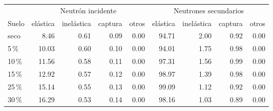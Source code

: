 \begin{tabular}{lrrrrrrrr}
\toprule
 & \multicolumn{4}{c}{Neutrón incidente} & \multicolumn{4}{c}{Neutrones secundarios} \\
\cmidrule(lr){2-5}\cmidrule(lr){6-9}
Suelo & elástica & inelástica & captura & otros & elástica & inelástica & captura & otros \\
\midrule
seco & 8.46 & 0.61 & 0.09 & 0.00 & 94.71 & 2.00 & 0.92 & 0.00 \\
5\,\% & 10.03 & 0.60 & 0.10 & 0.00 & 94.01 & 1.75 & 0.98 & 0.00 \\
10\,\% & 11.56 & 0.58 & 0.11 & 0.00 & 97.31 & 1.56 & 0.99 & 0.00 \\
15\,\% & 12.92 & 0.57 & 0.12 & 0.00 & 98.97 & 1.39 & 0.98 & 0.00 \\
25\,\% & 15.14 & 0.55 & 0.13 & 0.00 & 99.09 & 1.12 & 0.92 & 0.00 \\
30\,\% & 16.29 & 0.53 & 0.14 & 0.00 & 98.16 & 1.03 & 0.89 & 0.00 \\
\bottomrule
\end{tabular}
